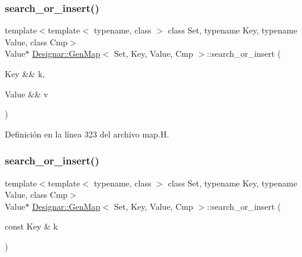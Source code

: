 \mbox{\label{class_designar_1_1_gen_map_a3244d12da4c9186ea2c1eef6ad0cbdc9}} 
\subsubsection{\texorpdfstring{search\+\_\+or\+\_\+insert()}{search\_or\_insert()}\hspace{0.1cm}{\footnotesize\ttfamily [4/6]}}
{\footnotesize\ttfamily template$<$template$<$ typename, class $>$ class Set, typename Key, typename Value, class Cmp$>$ \\
Value$\ast$ \hyperlink{class_designar_1_1_gen_map}{Designar\+::\+Gen\+Map}$<$ Set, Key, Value, Cmp $>$\+::search\+\_\+or\+\_\+insert (\begin{DoxyParamCaption}\item[{Key \&\&}]{k,  }\item[{Value \&\&}]{v }\end{DoxyParamCaption})\hspace{0.3cm}{\ttfamily [inline]}}



Definición en la línea 323 del archivo map.\+H.

\mbox{\label{class_designar_1_1_gen_map_a4ccec29a17c547692c25f3185187d7bd}} 
\subsubsection{\texorpdfstring{search\+\_\+or\+\_\+insert()}{search\_or\_insert()}\hspace{0.1cm}{\footnotesize\ttfamily [5/6]}}
{\footnotesize\ttfamily template$<$template$<$ typename, class $>$ class Set, typename Key, typename Value, class Cmp$>$ \\
Value$\ast$ \hyperlink{class_designar_1_1_gen_map}{Designar\+::\+Gen\+Map}$<$ Set, Key, Value, Cmp $>$\+::search\+\_\+or\+\_\+insert (\begin{DoxyParamCaption}\item[{const Key \&}]{k }\end{DoxyParamCaption})\hspace{0.3cm}{\ttfamily [inline]}}



